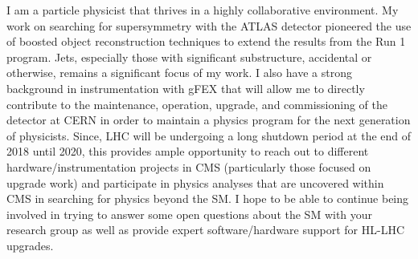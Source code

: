 I am a particle physicist that thrives in a highly collaborative environment. My work on searching for supersymmetry with the ATLAS detector pioneered the use of boosted object reconstruction techniques to extend the results from the Run 1 program. Jets, especially those with significant substructure, accidental or otherwise, remains a significant focus of my work. I also have a strong background in instrumentation with gFEX that will allow me to directly contribute to the maintenance, operation, upgrade, and commissioning of the detector at CERN in order to maintain a physics program for the next generation of physicists. Since, LHC will be undergoing a long shutdown period at the end of 2018 until 2020, this provides ample opportunity to reach out to different hardware/instrumentation projects in CMS (particularly those focused on upgrade work) and participate in physics analyses that are uncovered within CMS in searching for physics beyond the SM. I hope to be able to continue being involved in trying to answer some open questions about the SM with your research group as well as provide expert software/hardware support for HL-LHC upgrades.

\vspace{0.25cm}

\begin{footnotesize}


\end{footnotesize}


